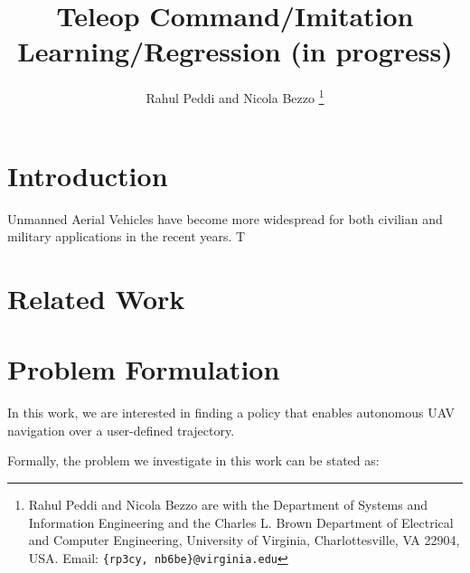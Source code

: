 \documentclass[letterpaper, 10 pt, conference]{ieeeconf}  %
\begin{document}
\title{\LARGE \bf
Teleop Command/Imitation Learning/Regression (in progress)
}


\author{Rahul Peddi and Nicola Bezzo%
\thanks{Rahul Peddi and Nicola Bezzo are with the Department of Systems and Information Engineering and the Charles L. Brown Department of Electrical and Computer Engineering, University of Virginia, Charlottesville, VA 22904, USA. Email: {\tt \{rp3cy, nb6be\}@virginia.edu}}}



\maketitle
\thispagestyle{empty}
\pagestyle{empty}


\begin{abstract}


\end{abstract}


\section{Introduction}
Unmanned Aerial Vehicles have become more widespread for both civilian and military applications in the recent years. T
\section{Related Work}


\section{Problem Formulation}
In this work, we are interested in finding a policy that enables autonomous UAV navigation over a user-defined trajectory.

Formally, the problem we investigate in this work can be stated as:
\end{document}
